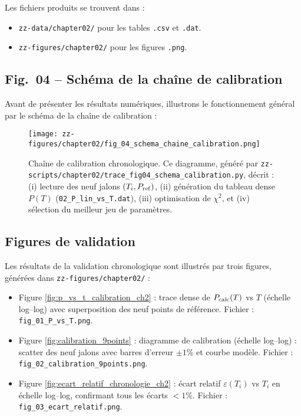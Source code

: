 Les fichiers produits se trouvent dans :
\begin{itemize}
  \item \texttt{zz-data/chapter02/} pour les tables \texttt{.csv} et \texttt{.dat}.
  \item \texttt{zz-figures/chapter02/} pour les figures \texttt{.png}.
\end{itemize}

\subsection{Fig.~04 – Schéma de la chaîne de calibration}

Avant de présenter les résultats numériques, illustrons le fonctionnement général par le schéma de la chaîne de calibration :

\begin{figure}[htbp]
  \centering
  \texttt{[image: zz-figures/chapter02/fig\_04\_schema\_chaine\_calibration.png]}
  \caption{Chaîne de calibration chronologique. Ce diagramme, généré par \texttt{zz-scripts/chapter02/trace\_fig04\_schema\_calibration.py}, décrit : 
    (i) lecture des neuf jalons \((T_i,P_{\rm ref})\), 
    (ii) génération du tableau dense \(P(T)\) (\texttt{02\_P\_lin\_vs\_T.dat}), 
    (iii) optimisation de \(\chi^2\), et 
    (iv) sélection du meilleur jeu de paramètres.}
  \label{fig:schema_chaine_calibration}
\end{figure}

\subsection{Figures de validation}

Les résultats de la validation chronologique sont illustrés par trois figures, générées dans \texttt{zz-figures/chapter02/} :

\begin{itemize}
  \item Figure \ref{fig:p_vs_t_calibration_ch2} :  
    trace dense de \(P_{\rm calc}(T)\) vs \(T\) (échelle log–log) avec superposition des neuf points de référence.  
    Fichier : \texttt{fig\_01\_P\_vs\_T.png}.
  
  \item Figure \ref{fig:calibration_9points} :  
    diagramme de calibration (échelle log–log) : scatter des neuf jalons avec barres d’erreur \(\pm1\%\) et courbe modèle.  
    Fichier : \texttt{fig\_02\_calibration\_9points.png}.
  
  \item Figure \ref{fig:ecart_relatif_chronologie_ch2} :  
    écart relatif \(\varepsilon(T_i)\) vs \(T_i\) en échelle log–log, confirmant tous les écarts \(<1\%\).  
    Fichier : \texttt{fig\_03\_ecart\_relatif.png}.
\end{itemize}

